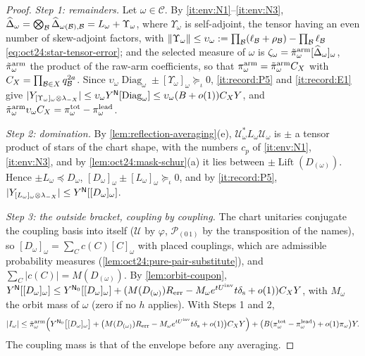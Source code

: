 \begin{proof}
\emph{Step 1: remainders.} Let $\omega\in\mathcal C$. By
\ref{it:env:N1}--\ref{it:env:N3},
$\widehat\Delta_\omega=\bigotimes_\mathcal B\widehat\Delta_{\omega(\mathcal B),\mathcal B}=L_\omega+\Upsilon_\omega$,
where $\Upsilon_\omega$ is self-adjoint, the tensor having an even number of
skew-adjoint factors, with $\|\Upsilon_\omega\|\le\upsilon_\omega:=\prod_\mathcal B(\ell_\mathcal B+\rho_\mathcal B)-
\prod_\mathcal B\ell_\mathcal B$ \eqref{eq:oct24:star-tensor-error}; and the selected measure of $\omega$
is $\zeta_\omega=\tilde\pi^{\rm arm}_\omega[\widehat\Delta_\omega]_\omega$, $\tilde\pi^{\rm arm}_\omega$ the
product of the raw-arm coefficients, so that $\pi^{\rm arm}_\omega=\tilde\pi^{\rm arm}_\omega C_X$
with $C_X=\prod_{\mathcal B\in X}q_\mathcal B^{2a}$. Since
$\upsilon_\omega\operatorname{Diag}_\omega\pm[\Upsilon_\omega]_\omega\succeq_\iota0$,
\ref{it:record:P5} and \ref{it:record:E1} give
$|Y_{[\Upsilon_\omega]_\omega\otimes\lambda_{-X}}|\le\upsilon_\omega Y^{\mathsf N}[\operatorname{Diag}_\omega]
\le\upsilon_\omega(B+o(1))C_XY$, and $\tilde\pi^{\rm arm}_\omega\upsilon_\omega C_X=
\pi^{\rm tot}_\omega-\pi^{\rm lead}_\omega$.

\emph{Step 2: domination.} By \cref{lem:reflection-averaging}(e),
$\mathcal U_\omega^*L_\omega\mathcal U_\omega$ is $\pm$ a tensor product of stars of the chart
shape, with the numbers $c_p$ of \ref{it:env:N1}, \ref{it:env:N3}, and by
\cref{lem:oct24:mask-schur}(a) it lies between $\pm\operatorname{Lift}(D_{(\omega)})$. Hence
$\pm L_\omega\preceq D_\omega$, $[D_\omega]_\omega\pm[L_\omega]_\omega\succeq_\iota0$, and by
\ref{it:record:P5}, $|Y_{[L_\omega]_\omega\otimes\lambda_{-X}}|\le Y^{\mathsf N}[[D_\omega]_\omega]$.

\emph{Step 3: the outside bracket, coupling by coupling.} The chart unitaries
conjugate the coupling basis into itself ($\mathcal U$ by $\varphi$, $\mathcal P_{(0\,1)}$ by the
transposition of the names), so $[D_\omega]_\omega=\sum_Cc(C)[C]_\omega$ with placed
couplings, which are admissible probability measures
(\cref{lem:oct24:pure-pair-substitute}), and $\sum_C|c(C)|=M(D_{(\omega)})$. By
\cref{lem:orbit-coupon},
$Y^{\mathsf N}[[D_\omega]_\omega]\le Y^{\mathsf N_0}[[D_\omega]_\omega]+(M(D_{(\omega)})R_{\rm err}
-M_\omega e^{tU^{\mathrm{inv}}}t\delta_{\rm s}+o(1))C_XY$, with $M_\omega$ the orbit mass of $\omega$
(zero if no $h$ applies). With Steps 1 and 2,
\[
 |I_\omega|\le\tilde\pi^{\rm arm}_\omega\Bigl(Y^{\mathsf N_0}\bigl[[D_\omega]_\omega\bigr]
 +\bigl(M(D_{(\omega)})R_{\rm err}-M_\omega e^{tU^{\mathrm{inv}}}t\delta_{\rm s}+o(1)\bigr)C_XY\Bigr)
 +\bigl(B(\pi^{\rm tot}_\omega-\pi^{\rm lead}_\omega)+o(1)\pi_\omega\bigr)Y .
\]
The coupling mass is that of the envelope before any averaging.


\end{proof}
